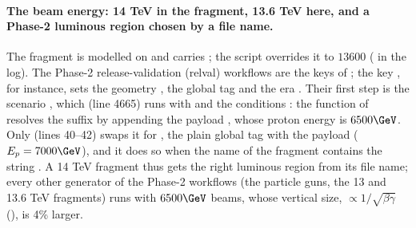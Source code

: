 \paragraph{The beam energy: 14 TeV in the fragment, 13.6 TeV here, and a Phase-2 luminous region chosen by a
file name.} The fragment is modelled on 
and carries ; the script overrides it to $13600$ ( in the log). The
Phase-2 release-validation (relval) workflows are the  keys of
; the key , for
instance, sets the geometry , the global tag  and the
era . Their first step is the scenario , which 
(line 4665) runs with  and the conditions : the
function  of  resolves the
suffix by appending the payload , whose proton energy
is $6500\GeV$. Only  (lines 40--42) swaps it for , the plain
global tag with the payload  ($E_p = 7000\GeV$), and it does so when the name of
the fragment contains the string . A 14 TeV fragment thus gets the right luminous region from its
file name; every other generator of the Phase-2 workflows (the particle guns, the 13 and 13.6 TeV fragments)
runs with $6500\GeV$ beams, whose vertical size, $\propto 1/\sqrt{\beta\gamma}$
(), is 4\% larger.

